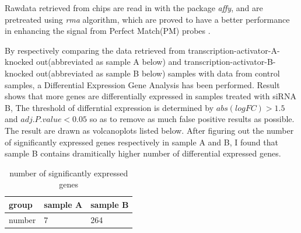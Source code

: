 \documentclass[fleqn,10pt]{wlscirep}
\begin{document}
Rawdata retrieved from chips are read in with the package \textit{affy}, and are pretreated using \textit{rma} algorithm, which are proved to have a better performance in enhancing the signal from Perfect Match(PM) probes \cite{jianshu.com}. 

By respectively comparing the data retrieved from transcription-activator-A-knocked out(abbreviated as sample A below) and transcription-activator-B-knocked out(abbreviated as sample B below) samples with data from control samples, a Differential Expression Gene Analysis has been performed. Result shows that more genes are differentially expressed in samples treated with siRNA B, The threshold of differntial expression is determined by $abs(logFC) > 1.5$ and $adj.P.value < 0.05$ so as to remove as much false positive results as possible.  The result are drawn as volcanoplots listed below.
After figuring out the number of significantly expressed genes respectively in sample A and B, I found that sample B contains dramitically higher number of differential expressed genes.

\begin{table}[ht]
    \centering
    \begin{tabular}{|l|l|l|}
    \hline
    group & sample A & sample B \\
    \hline
    number & 7 & 264 \\
    \hline
    \end{tabular}
    \caption{\label{tab:example}number of significantly expressed genes }
    \end{table}
\end{document}
